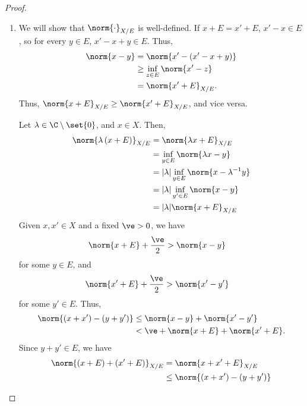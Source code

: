 \documentclass[10pt]{mypackage}
\begin{document}
\begin{proof}\hfill
  \begin{enumerate}[(1)]
    \item We will show that $\norm{\cdot}_{X/E}$ is well-defined. If $x + E = x' + E$, $x'-x\in E$, so for every $y\in E$, $x'-x + y\in E$. Thus,
    \begin{align*}
      \norm{x-y} &= \norm{x'-\left(x'-x+y\right)}\\
                 &\geq \inf_{z\in E}\norm{x' - z}\\
                 &= \norm{x' + E}_{X/E}.
    \end{align*}
    Thus, $\norm{x + E}_{X/E} \geq \norm{x' + E}_{X/E}$, and vice versa.\newline

    Let $\lambda \in \C\setminus \set{0}$, and $x\in X$. Then,
    \begin{align*}
      \norm{\lambda\left(x + E\right)}_{X/E} &= \norm{\lambda x + E}_{X/E}\\
                                             &= \inf_{y\in E}\norm{\lambda x - y}\\
                                             &= |\lambda|\inf_{y\in E}\norm{x - \lambda^{-1}y}\\
                                             &= |\lambda|\inf_{y'\in E}\norm{x-y}\\
                                             &= |\lambda|\norm{x + E}_{X/E}
    \end{align*}
    Given $x,x'\in X$ and a fixed $\ve > 0$, we have
    \begin{align*}
      \norm{x + E} + \frac{\ve}{2} &> \norm{x-y}
    \end{align*}
    for some $y\in E$, and
    \begin{align*}
      \norm{x' + E} + \frac{\ve}{2} &> \norm{x'-y'}
    \end{align*}
    for some $y'\in E$. Thus,
    \begin{align*}
      \norm{\left(x+x'\right)-\left(y+y'\right)} &\leq \norm{x-y} + \norm{x' - y'}\\
                                                 &< \ve + \norm{x + E} + \norm{x' + E}.
    \end{align*}
    Since $y + y'\in E$, we have
    \begin{align*}
      \norm{\left(x+E\right) + \left(x' + E\right)}_{X/E} &= \norm{x + x' + E}_{X/E}\\
                                                    &\leq \norm{\left(x+x'\right) - \left(y+y'\right)}\\

\end{align*}
\end{enumerate}
\end{proof}
\end{document}
